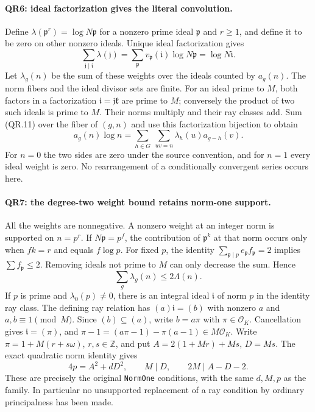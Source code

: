 \paragraph{QR6: ideal factorization gives the literal convolution.}
Define $\lambda(\mathfrak p^r)=\log N\mathfrak p$ for a nonzero
prime ideal $\mathfrak p$ and $r\ge1$, and define it to be zero on
other nonzero ideals. Unique ideal factorization gives
\[
 \sum_{\mathfrak j\mid\mathfrak i}\lambda(\mathfrak j)
       =\sum_{\mathfrak p}v_{\mathfrak p}(\mathfrak i)
                                \log N\mathfrak p
       =\log N\mathfrak i.                               \tag{QR.11}
\]
Let $\lambda_g(n)$ be the sum of these weights over the ideals counted
by $a_g(n)$. The norm fibers and the ideal divisor sets are finite.
For an ideal prime to $M$, both factors in a factorization
$\mathfrak i=\mathfrak j\mathfrak k$ are prime to $M$; conversely
the product of two such ideals is prime to $M$. Their norms multiply
and their ray classes add. Sum (QR.11) over the fiber of $(g,n)$ and
use this factorization bijection to obtain
\[
 a_g(n)\log n
  =\sum_{h\in G}\ \sum_{uv=n}\lambda_h(u)a_{g-h}(v).       \tag{QR.12}
\]
For $n=0$ the two sides are zero under the source convention, and
for $n=1$ every ideal weight is zero. No rearrangement of a conditionally
convergent series occurs here.

\paragraph{QR7: the degree-two weight bound retains norm-one support.}
All the weights are nonnegative. A nonzero weight at an integer norm
is supported on $n=p^r$. If $N\mathfrak p=p^f$, the contribution
of $\mathfrak p^k$ at that norm occurs only when $fk=r$ and equals
$f\log p$. For fixed $p$, the identity
$\sum_{\mathfrak p\mid p}e_{\mathfrak p}f_{\mathfrak p}=2$
implies $\sum f_{\mathfrak p}\le2$. Removing ideals not prime to
$M$ can only decrease the sum. Hence
\[
             \sum_g\lambda_g(n)\le2\Lambda(n).            \tag{QR.13}
\]
If $p$ is prime and $\lambda_0(p)\ne0$, there is an integral ideal
$\mathfrak i$ of norm $p$ in the identity ray class. The defining
ray relation has $(a)\mathfrak i=(b)$ with nonzero $a$ and
$a,b\equiv1\pmod M$. Since $(b)\subseteq(a)$, write $b=a\pi$
with $\pi\in\mathcal O_K$. Cancellation gives $\mathfrak i=(\pi)$,
and
$\pi-1=(a\pi-1)-\pi(a-1)\in M\mathcal O_K$.
Write $\pi=1+M(r+s\omega)$, $r,s\in\mathbb Z$, and put
$A=2(1+Mr)+Ms$, $D=Ms$. The exact quadratic norm identity gives
\[
       4p=A^2+dD^2,\qquad M\mid D,\qquad
                          2M\mid A-D-2.                  \tag{QR.14}
\]
These are precisely the original \texttt{NormOne} conditions, with
the same $d,M,p$ as the family. In particular no unsupported
replacement of a ray condition by ordinary principalness has been made.

